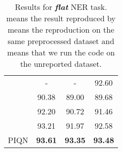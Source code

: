 \documentclass[11pt]{article}
\begin{document}
\begin{table}[!h]
\begin{tabular}{lccc}
\citet{devlin-etal-2019-bert} & - & - & 92.60 \\
\citet{li-etal-2020-unified} & 90.38 & 89.00 & 89.68     \\
\citet{shen2021locateandlabel} &  92.20 & 90.72 & 91.46\\
\citet{tan2021sequencetoset} & 93.21 & 91.97 & 92.58    \\
\midrule
PIQN    &  \textbf{93.61}  & \textbf{93.35}  & \textbf{93.48}  \\

\bottomrule
\end{tabular}
\caption{Results for \textit{\textbf{flat}} NER task.  means the result reproduced by \cite{yan2021bartner} means the reproduction on the same preprocessed dataset and  means that we run the code on the unreported dataset.}
\label{tab:flat}
\end{table}
\end{document}
